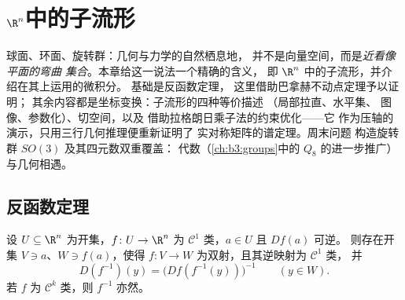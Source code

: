 \chapter{\texorpdfstring{$\R^n$}{Rn}中的子流形}
\label{ch:b3:submanifolds}

球面、环面、旋转群：几何与力学的自然栖息地，
并不是向量空间，而是\emph{近看像平面的弯曲
集合}。本章给这一说法一个精确的含义，
即 $\R^n$ 中的子流形，并介绍在其上运用的微积分。
基础是反函数定理，
这里借助巴拿赫不动点定理予以证明；
其余内容都是坐标变换：子流形的四种等价描述
（局部拉直、水平集、
图像、参数化）、切空间，以及
借助拉格朗日乘子法的约束优化——它
作为压轴的演示，只用三行几何推理便重新证明了
实对称矩阵的谱定理。周末问题
构造旋转群 $SO(3)$ 及其四元数双重覆盖：
代数（\cref{ch:b3:groups}中的
$Q_8$ 的进一步推广）与几何相遇。

\section{反函数定理}

\begin{theorem}[反函数定理]
\label{thm:b3:submanifolds:ift}
设 $U \subseteq \R^n$ 为开集，$f \colon U \to \R^n$ 为
$\mathcal C^1$ 类，$a \in U$ 且 $Df(a)$ 可逆。
则存在开集 $V \ni a$、$W \ni f(a)$，使得
$f \colon V \to W$ 为双射，且其逆映射为 $\mathcal C^1$ 类，
并
\[
D(f^{-1})(y) = \bigl(Df(f^{-1}(y))\bigr)^{-1}
\qquad (y \in W).
\]
若 $f$ 为 $\mathcal C^k$ 类，则 $f^{-1}$ 亦然。
\end{theorem}

